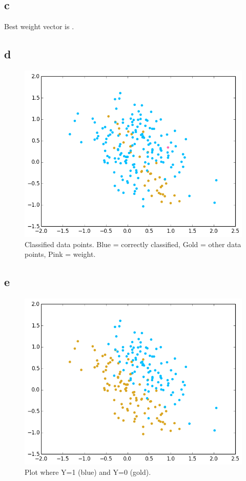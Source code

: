\documentclass[11pt,a4paper]{article}
\begin{document}
\subsection*{c}
Best weight vector is .

\subsection*{d}
\begin{figure}[h]
\centering
 \includegraphics[width=\textwidth]{./2_2_d.png}
\caption{Classified data points. Blue = correctly classified, Gold = other data points, Pink = weight.}
\end{figure}

\subsection*{e}
\begin{figure}[h]
\centering
 \includegraphics[width=\textwidth]{./2_2_a.png}
\caption{Plot where Y=1 (blue) and Y=0 (gold).}
\end{figure}
\end{document}
